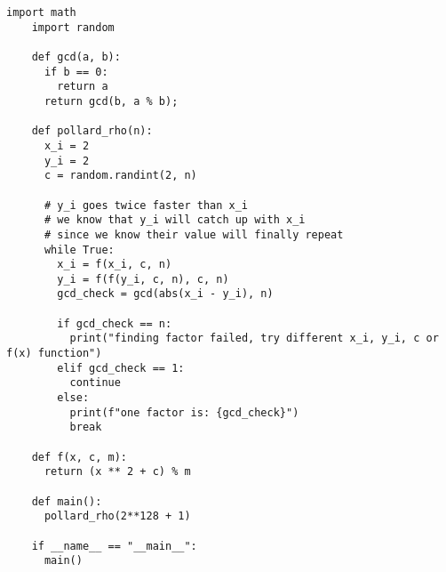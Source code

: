 \documentclass[12pt,letterpaper]{article}
\begin{document}
  \begin{lstlisting}[style = Python]
    import math
    import random
    
    def gcd(a, b):
      if b == 0:
        return a
      return gcd(b, a % b);
    
    def pollard_rho(n):
      x_i = 2
      y_i = 2
      c = random.randint(2, n)
    
      # y_i goes twice faster than x_i
      # we know that y_i will catch up with x_i
      # since we know their value will finally repeat
      while True:
        x_i = f(x_i, c, n)
        y_i = f(f(y_i, c, n), c, n)
        gcd_check = gcd(abs(x_i - y_i), n)
    
        if gcd_check == n:
          print("finding factor failed, try different x_i, y_i, c or f(x) function")
        elif gcd_check == 1:
          continue
        else:
          print(f"one factor is: {gcd_check}")
          break
    
    def f(x, c, m):
      return (x ** 2 + c) % m
    
    def main():
      pollard_rho(2**128 + 1) 
    
    if __name__ == "__main__":
      main()
  \end{lstlisting}
    \clearpage
\end{document}
